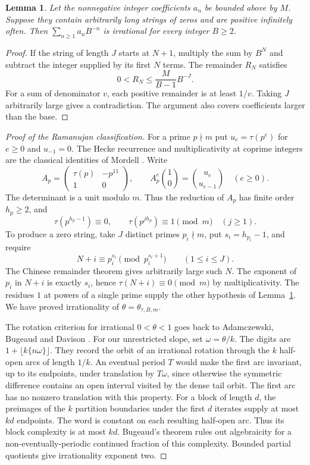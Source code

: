 \documentclass[11pt,a4paper]{article}
\newtheorem{lemma}[theorem]{Lemma}
\begin{document}
\begin{lemma}\label{lem:zero}
Let the nonnegative integer coefficients \(a_n\) be bounded above by \(M\). Suppose they contain arbitrarily long strings of zeros and are positive infinitely often. Then \(\sum_{n\ge1}a_n B^{-n}\) is irrational for every integer \(B\ge2\).
\end{lemma}
\begin{proof}
If the string of length \(J\) starts at \(N+1\), multiply the sum by \(B^N\) and subtract the integer supplied by its first \(N\) terms. The remainder \(R_N\) satisfies
\[
 0<R_N\le \frac{M}{B-1}B^{-J}.
\]
For a sum of denominator \(v\), each positive remainder is at least \(1/v\). Taking \(J\) arbitrarily large gives a contradiction. The argument also covers coefficients larger than the base.
\end{proof}
\begin{proof}[Proof of the Ramanujan classification]
For a prime \(p\nmid m\) put \(u_e=\tau(p^e)\) for \(e\ge0\) and \(u_{-1}=0\). The Hecke recurrence and multiplicativity at coprime integers are the classical identities of Mordell \cite{mordell}. Write
\[
 A_p=\begin{pmatrix}\tau(p)&-p^{11}\\1&0\end{pmatrix},\qquad
 A_p^e\binom10=\binom{u_e}{u_{e-1}}\quad(e\ge0).
\]
The determinant is a unit modulo \(m\). Thus the reduction of \(A_p\) has finite order \(h_p\ge2\), and
\[
 \tau(p^{h_p-1})\equiv0,\qquad \tau(p^{jh_p})\equiv1\pmod m\quad(j\ge1).
\]
To produce a zero string, take \(J\) distinct primes \(p_i\nmid m\), put \(s_i=h_{p_i}-1\), and require
\[
 N+i\equiv p_i^{s_i}\pmod {p_i^{s_i+1}}\qquad(1\le i\le J).
\]
The Chinese remainder theorem gives arbitrarily large such \(N\). The exponent of \(p_i\) in \(N+i\) is exactly \(s_i\), hence \(\tau(N+i)\equiv0\pmod m\) by multiplicativity. The residues \(1\) at powers of a single prime supply the other hypothesis of Lemma~\ref{lem:zero}. We have proved irrationality of \(\theta=\theta_{\tau,B,m}\).

The rotation criterion for irrational $0<\theta<1$ goes back to Adamczewski, Bugeaud and Davison \cite[Thm.~4.1]{abd}. For our unrestricted slope, set \(\omega=\theta/k\). The digits are \(1+\lfloor k\{n\omega\}\rfloor\). They record the orbit of an irrational rotation through the \(k\) half-open arcs of length \(1/k\). An eventual period \(T\) would make the first arc invariant, up to its endpoints, under translation by \(T\omega\), since otherwise the symmetric difference contains an open interval visited by the dense tail orbit. The first arc has no nonzero translation with this property. For a block of length \(d\), the preimages of the \(k\) partition boundaries under the first \(d\) iterates supply at most \(kd\) endpoints. The word is constant on each resulting half-open arc. Thus its block complexity is at most \(kd\). Bugeaud's theorem \cite[Thm.~1.1]{bug2013} rules out algebraicity for a non-eventually-periodic continued fraction of this complexity. Bounded partial quotients give irrationality exponent two.
\end{proof}
\end{document}
